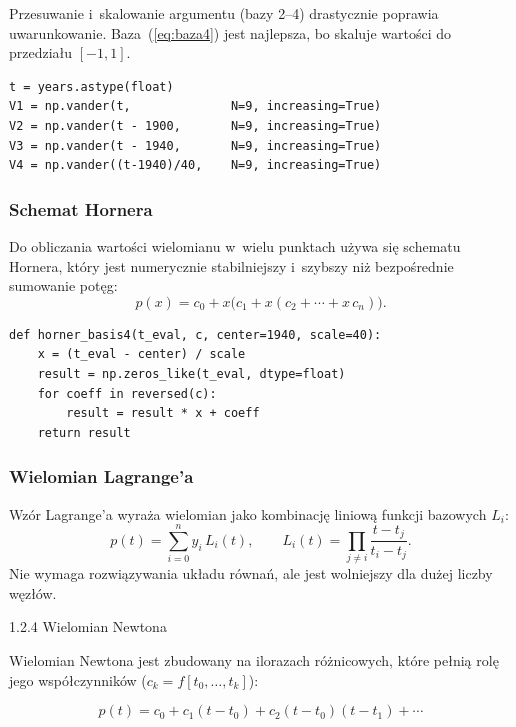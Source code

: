 \documentclass[12pt, a4paper]{article}
\begin{document}
Przesuwanie i~skalowanie argumentu (bazy 2--4) drastycznie poprawia
uwarunkowanie. Baza~(\ref{eq:baza4}) jest najlepsza, bo skaluje wartości do
przedziału $[-1, 1]$.
\newpage
\begin{lstlisting}[caption={Budowa macierzy Vandermonde'a}]
t = years.astype(float)
V1 = np.vander(t,              N=9, increasing=True)
V2 = np.vander(t - 1900,       N=9, increasing=True)
V3 = np.vander(t - 1940,       N=9, increasing=True)
V4 = np.vander((t-1940)/40,    N=9, increasing=True)
\end{lstlisting}

\subsubsection{Schemat Hornera}

Do obliczania wartości wielomianu w~wielu punktach używa się schematu Hornera,
który jest numerycznie stabilniejszy i~szybszy niż bezpośrednie sumowanie potęg:
\begin{equation}
  p(x) = c_0 + x\bigl(c_1 + x(c_2 + \cdots + x\,c_n)\bigr).
\end{equation}

\begin{lstlisting}[caption={Schemat Hornera dla bazy 4}]
def horner_basis4(t_eval, c, center=1940, scale=40):
    x = (t_eval - center) / scale
    result = np.zeros_like(t_eval, dtype=float)
    for coeff in reversed(c):
        result = result * x + coeff
    return result
\end{lstlisting}

\subsubsection{Wielomian Lagrange'a}

Wzór Lagrange'a wyraża wielomian jako kombinację liniową funkcji bazowych $L_i$:
\begin{equation}
  p(t) = \sum_{i=0}^{n} y_i\, L_i(t), \qquad
  L_i(t) = \prod_{j \neq i} \frac{t - t_j}{t_i - t_j}.
\end{equation}
Nie wymaga rozwiązywania układu równań, ale jest wolniejszy dla dużej liczby węzłów.

1.2.4 Wielomian Newtona

Wielomian Newtona jest zbudowany na ilorazach różnicowych, które pełnią rolę jego współczynników ($c_k = f[t_0, \dots, t_k]$):

\begin{equation}
  p(t) = c_0 + c_1(t{-}t_0) + c_2(t{-}t_0)(t{-}t_1) + \cdots
\end{equation}
\end{document}
